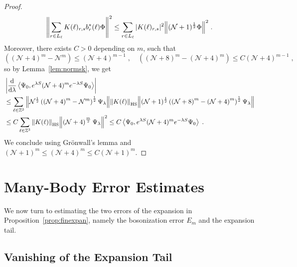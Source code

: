 \documentclass[12pt,a4paper]{article}
\numberwithin{equation}{section}
\newcommand{\cN}{\mathcal{N}}
\newcommand{\1}{\mathbb{I}}
\newcommand{\di}{\textnormal{d}}
\newcommand{\HS}{\mathrm{HS}}
\newcommand{\Zstar}{\mathbb{Z}^3} %
\newcommand{\Z}{\mathbb{Z}}
\newcommand{\NN}{\mathcal{N}}
\newcommand{\half}{\frac{1}{2}}
\newcommand{\eva}[1]{\left\langle #1 \right\rangle}
\theoremstyle{plain}
\theoremstyle{definition}
\theoremstyle{remark}
\theoremstyle{plain}
\theoremstyle{definition}
\theoremstyle{remark}
\begin{document}
\begin{proof}
\begin{equation}
	\norm{\sum_{r\in L_\ell} K(\ell)_{r,s} b^*_{r}(\ell) \Phi}^2
	\le \sum_{r\in L_\ell} |K(\ell)_{r,s}|^2
		\norm{(\cN + 1)^{\half} \Phi}^2 \;.
\end{equation}
Moreover, there exists $ C > 0 $ depending on $ m $, such that
\begin{equation}
	\left( \left(\NN+4\right)^m - \NN^m \right)
	\leq \left(\NN+4\right)^{m-1} \;, \quad
	\left( \left(\NN+8\right)^m - \left(\NN+4\right)^m \right)
	\leq C \left(\NN+4\right)^{m-1} \;,
\end{equation}
so by Lemma~\ref{lem:normsk}, we get
\begin{align}
	&\left|\frac{\di}{\di\lambda}\eva{\Psi_0, e^{\lambda S} (\mathcal{N}+4)^m e^{-\lambda S} \Psi_0 }\right| \nonumber\\
	&\leq \sum_{\ell\in \Zstar}
		\norm{ \NN^\half \left( \left(\NN+4\right)^m - \NN^m \right)^\half \Psi_\lambda}
		\norm{K(\ell)}_{\HS}
		\norm{ (\NN+1)^\half \left( \left(\NN+8\right)^m - \left(\NN+4\right)^m \right)^\half \Psi_\lambda } \nonumber\\
	&\leq C \sum_{\ell\in \Zstar}
		\norm{K(\ell)}_{\HS}
		\norm{ \left(\NN+4\right)^\frac{m}{2} \Psi_\lambda}^2
	\leq C \eva{\Psi_0, e^{\lambda S} (\mathcal{N}+4)^m e^{-\lambda S} \Psi_0 } \;.
\end{align}
We conclude using Gr\"onwall's lemma and $ (\cN+1)^m \le (\cN+4)^m \le C (\cN+1)^m $.
\end{proof}

\section{Many-Body Error Estimates}
\label{subsec:manybody_estimates}

We now turn to estimating the two errors of the expansion in Proposition~\ref{prop:finexpan}, namely the bosonization error $ E_m $ and the expansion tail.


\subsection{Vanishing of the Expansion Tail}
\label{subsec:tailestimate}
\end{document}
